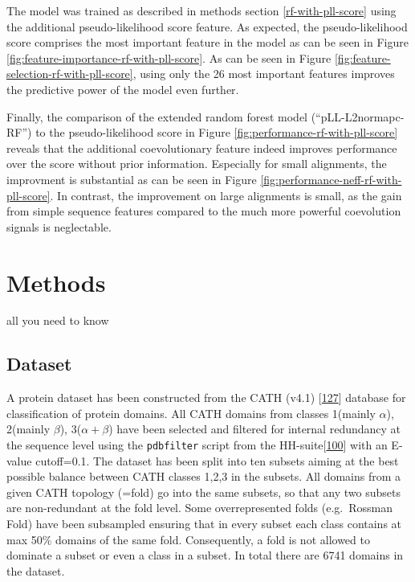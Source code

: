 \documentclass[12pt,a4paper,twoside]{book}
\theoremstyle{definition}
\theoremstyle{definition}
\theoremstyle{remark}
\begin{document}
The model was trained as described in methods section
\ref{rf-with-pll-score} using the additional pseudo-likelihood score
feature. As expected, the pseudo-likelihood score comprises the most
important feature in the model as can be seen in Figure
\ref{fig:feature-importance-rf-with-pll-score}. As can be seen in Figure
\ref{fig:feature-selection-rf-with-pll-score}, using only the 26 most
important features improves the predictive power of the model even
further.

Finally, the comparison of the extended random forest model
(``pLL-L2normapc-RF'') to the pseudo-likelihood score in Figure
\ref{fig:performance-rf-with-pll-score} reveals that the additional
coevolutionary feature indeed improves performance over the score
without prior information. Especially for small alignments, the
improvment is substantial as can be seen in Figure
\ref{fig:performance-neff-rf-with-pll-score}. In contrast, the
improvement on large alignments is small, as the gain from simple
sequence features compared to the much more powerful coevolution signals
is neglectable.

\chapter{Methods}\label{methods}

all you need to know

\section{Dataset}\label{dataset}

A protein dataset has been constructed from the CATH (v4.1)
{[}\protect\hyperlink{ref-Sillitoe2015}{127}{]} database for
classification of protein domains. All CATH domains from classes
1(mainly \(\alpha\)), 2(mainly \(\beta\)), 3(\(\alpha+\beta\)) have been
selected and filtered for internal redundancy at the sequence level
using the \texttt{pdbfilter} script from the
HH-suite{[}\protect\hyperlink{ref-Remmert2012}{100}{]} with an E-value
cutoff=0.1. The dataset has been split into ten subsets aiming at the
best possible balance between CATH classes 1,2,3 in the subsets. All
domains from a given CATH topology (=fold) go into the same subsets, so
that any two subsets are non-redundant at the fold level. Some
overrepresented folds (e.g.~Rossman Fold) have been subsampled ensuring
that in every subset each class contains at max 50\% domains of the same
fold. Consequently, a fold is not allowed to dominate a subset or even a
class in a subset. In total there are 6741 domains in the dataset.
\end{document}

